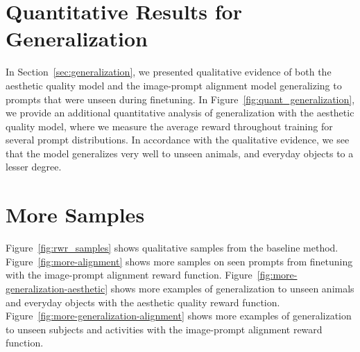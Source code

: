 \begin{appendices}
\section{Quantitative Results for Generalization}
\label{app:generalization}
In Section~\ref{sec:generalization}, we presented qualitative evidence of both the aesthetic quality model and the image-prompt alignment model generalizing to prompts that were unseen during finetuning. In Figure~\ref{fig:quant_generalization}, we provide an additional quantitative analysis of generalization with the aesthetic quality model, where we measure the average reward throughout training for several prompt distributions. In accordance with the qualitative evidence, we see that the model generalizes very well to unseen animals, and everyday objects to a lesser degree.



\section{More Samples}
\label{app:more_samples}

Figure~\ref{fig:rwr_samples} shows qualitative samples from the baseline \methodrwr{} method.
Figure~\ref{fig:more-alignment} shows more samples on seen prompts from \methodours{} finetuning with the image-prompt alignment reward function.
Figure~\ref{fig:more-generalization-aesthetic} shows more examples of generalization to unseen animals and everyday objects with the aesthetic quality reward function.
Figure~\ref{fig:more-generalization-alignment} shows more examples of generalization to unseen subjects and activities with the image-prompt alignment reward function.









\end{appendices}
